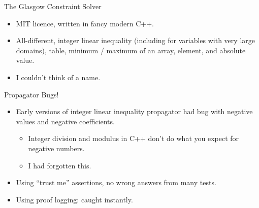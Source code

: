 \documentclass[aspectratio=169,compress,10pt]{beamer}
\begin{document}
\begin{frame}{The Glasgow Constraint Solver}
    \begin{center}
        \bigskip
    \end{center}
    \begin{itemize}
        \item MIT licence, written in fancy modern C++.
        \item All-different, integer linear inequality (including for variables
            with very large domains), table, minimum / maximum of an array,
            element, and absolute value.
        \item I couldn't think of a name.
    \end{itemize}
\end{frame}

\begin{frame}{Propagator Bugs!}
    \begin{itemize}
        \item Early versions of integer linear inequality propagator had bug with negative values and negative coefficients.
            \begin{itemize}
                \item Integer division and modulus in C++ don't do what you expect for negative numbers.
                \item I had forgotten this.
            \end{itemize}
        \item Using ``trust me'' assertions, no wrong answers from many tests.
        \item Using proof logging: caught instantly.
    \end{itemize}
\end{frame}
\end{document}
